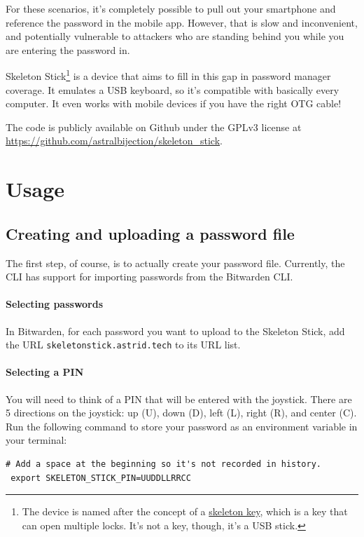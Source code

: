 \documentclass{article}
\begin{document}
For these scenarios, it's completely possible to pull out your smartphone and reference the password in the mobile app. However, that is slow and inconvenient, and potentially vulnerable to attackers who are standing behind you while you are entering the password in.

Skeleton Stick\footnote{The device is named after the concept of a \href{https://en.wikipedia.org/wiki/Skeleton_key}{skeleton key}, which is a key that can open multiple locks. It's not a key, though, it's a USB stick.} is a device that aims to fill in this gap in password manager coverage. It emulates a USB keyboard, so it's compatible with basically every computer. It even works with mobile devices if you have the right OTG cable!

The code is publicly available on Github under the GPLv3 license at \url{https://github.com/astralbijection/skeleton_stick}.

\section{Usage}

\subsection{Creating and uploading a password file}

The first step, of course, is to actually create your password file. Currently, the CLI has support for importing passwords from the Bitwarden CLI.

\paragraph{Selecting passwords} In Bitwarden, for each password you want to upload to the Skeleton Stick, add the URL \texttt{skeletonstick.astrid.tech} to its URL list.

\paragraph{Selecting a PIN} You will need to think of a PIN that will be entered with the joystick. There are 5 directions on the joystick: up (U), down (D), left (L), right (R), and center (C). Run the following command to store your password as an environment variable in your terminal:

\begin{verbatim}
# Add a space at the beginning so it's not recorded in history.
 export SKELETON_STICK_PIN=UUDDLLRRCC  
\end{verbatim}
\end{document}
